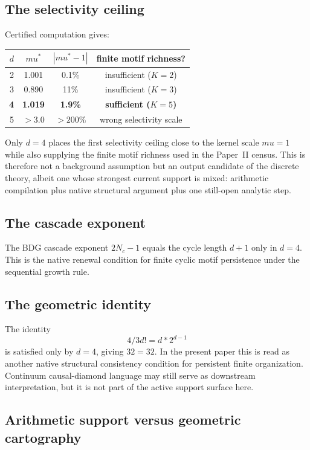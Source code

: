 \documentclass[11pt]{article}
\def\mu{mu}%
\def\frac#1#2{#1/#2}%
\def\cdot{*}%
\begin{document}
\subsection{The selectivity ceiling}

Certified computation gives:
\begin{center}
\begin{tabular}{rccc}
\toprule
$d$ & $\mu^*$ & $|\mu^*-1|$ & finite motif richness? \\
\midrule
2 & 1.001 & 0.1\% & insufficient ($K=2$) \\
3 & 0.890 & 11\% & insufficient ($K=3$) \\
\textbf{4} & \textbf{1.019} & \textbf{1.9\%} & \textbf{sufficient ($K=5$)} \\
5 & $>3.0$ & $>200\%$ & wrong selectivity scale \\
\bottomrule
\end{tabular}
\end{center}

Only $d=4$ places the first selectivity ceiling close to the kernel scale $\mu=1$ while also supplying the finite motif richness used in the Paper~II census. This is therefore not a background assumption but an output candidate of the discrete theory, albeit one whose strongest current support is mixed: arithmetic compilation plus native structural argument plus one still-open analytic step.

\subsection{The cascade exponent}

The BDG cascade exponent $2N_c-1$ equals the cycle length $d+1$ only in $d=4$. This is the native renewal condition for finite cyclic motif persistence under the sequential growth rule.

\subsection{The geometric identity}

The identity
\[
\frac{4}{3}d! = d\cdot 2^{d-1}
\]
is satisfied only by $d=4$, giving $32=32$. In the present paper this is read as another native structural consistency condition for persistent finite organization. Continuum causal-diamond language may still serve as downstream interpretation, but it is not part of the active support surface here.

\subsection{Arithmetic support versus geometric cartography}
\end{document}
